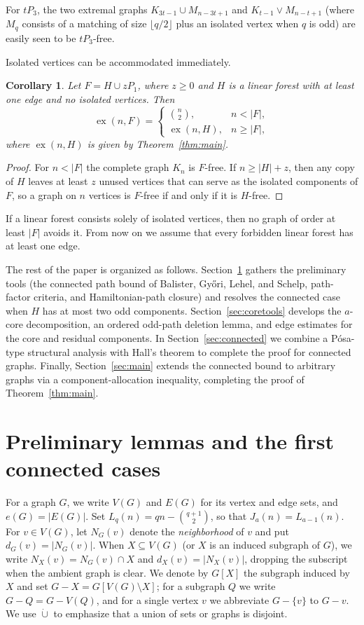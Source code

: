 \documentclass[10pt]{article}
\theoremstyle{compactplain}
\newtheorem{corollary}[theorem]{Corollary}
\theoremstyle{remark}\newtheorem{remark}[theorem]{Remark}
\newcommand{\ex}{\operatorname{ex}}
\begin{document}
For $tP_3$, the two extremal graphs $K_{3t-1}\cup M_{n-3t+1}$ and
$K_{t-1}\vee M_{n-t+1}$ (where $M_q$ consists of a matching of size
$\lfloor q/2\rfloor$ plus an isolated vertex when $q$ is odd) are easily
seen to be $tP_3$-free.

Isolated vertices can be accommodated immediately.

\begin{corollary}
Let $F=H\cup zP_1$, where $z\ge0$ and $H$ is a linear forest with at
least one edge and no isolated vertices. Then
\[
 \ex(n,F)=
 \begin{cases}
  \binom{n}{2}, & n<|F|,\\
  \ex(n,H), & n\ge|F|,
 \end{cases}
\]
where $\ex(n,H)$ is given by Theorem~\ref{thm:main}.
\end{corollary}
\begin{proof}
For $n<|F|$ the complete graph $K_n$ is $F$-free. If $n\ge|H|+z$, then
any copy of $H$ leaves at least $z$ unused vertices that can serve as the
isolated components of $F$, so a graph on $n$ vertices is $F$-free if
and only if it is $H$-free.
\end{proof}

If a linear forest consists solely of isolated vertices, then no graph of
order at least $|F|$ avoids it. From now on we assume that every
forbidden linear forest has at least one edge.

The rest of the paper is organized as follows. Section~\ref{sec:prelim}
gathers the preliminary tools (the connected path bound of
Balister, Gy\H{o}ri, Lehel, and Schelp, path-factor criteria, and
Hamiltonian-path closure) and resolves the connected case when $H$ has at
most two odd components. Section~\ref{sec:coretools} develops the
$a$-core decomposition, an ordered odd-path deletion lemma, and edge
estimates for the core and residual components. In
Section~\ref{sec:connected} we combine a P\'osa-type structural analysis
with Hall's theorem to complete the proof for connected graphs. Finally,
Section~\ref{sec:main} extends the connected bound to arbitrary graphs
via a component-allocation inequality, completing the proof of
Theorem~\ref{thm:main}.

\section{Preliminary lemmas and the first connected cases}\label{sec:prelim}

For a graph $G$, we write $V(G)$ and $E(G)$ for its vertex and edge
sets, and $e(G)=|E(G)|$. Set $L_q(n)=qn-\binom{q+1}{2}$, so that
$J_a(n)=L_{a-1}(n)$. For $v\in V(G)$, let $N_G(v)$ denote the
\emph{neighborhood} of $v$ and put $d_G(v)=|N_G(v)|$. When
$X\subseteq V(G)$ (or $X$ is an induced subgraph of $G$), we write
$N_X(v)=N_G(v)\cap X$ and $d_X(v)=|N_X(v)|$, dropping the subscript when
the ambient graph is clear. We denote by $G[X]$ the subgraph induced by
$X$ and set $G-X=G[V(G)\setminus X]$; for a subgraph $Q$ we write
$G-Q=G-V(Q)$, and for a single vertex $v$ we abbreviate $G-\{v\}$ to
$G-v$. We use $\dot\cup$ to emphasize that a union of sets or graphs is
disjoint.
\end{document}
